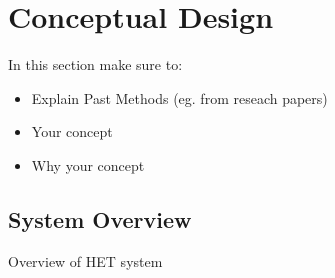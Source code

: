 \section{Conceptual Design}

In this section make sure to:
\begin{itemize}

    \item Explain Past Methods (eg. from reseach papers)

    \item Your concept

    \item Why your concept
\end{itemize}

\subsection{System Overview}

Overview of HET system